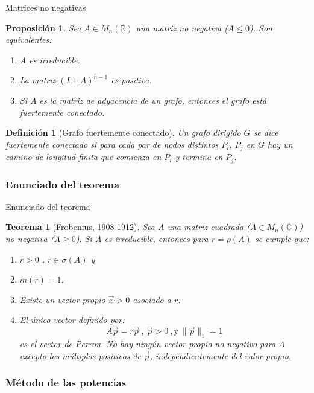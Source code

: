 \documentclass[ignorenonframetext,aspectratio=43,]{beamer}
\newtheorem{teorema}{Teorema}
\newtheorem{definicion}{Definición}
\newtheorem{proposicion}{Proposición}
\begin{document}
\begin{frame}{Matrices no negativas}
\begin{proposicion}
\label{irreducible}
\label{positiva}
Sea $A \in M_n(\mathbb{R})$ una matriz no negativa ($A \leq 0$). Son equivalentes:
\begin{enumerate}
\item A es irreducible.
\item La matriz $(I + A)^{n - 1}$ es positiva.
\item Si $A$ es la matriz de adyacencia de un grafo, entonces el grafo está fuertemente conectado.
\end{enumerate}
\end{proposicion}

\begin{definicion}[Grafo fuertemente conectado]
Un grafo dirigido $G$ se dice fuertemente conectado si para cada par de nodos distintos $P_i$, $P_j$ en $G$ hay un camino de longitud finita que comienza en $P_i$ y termina en $P_j$.
\end{definicion}
\end{frame}

\subsubsection{Enunciado del teorema}

\begin{frame}{Enunciado del teorema}
\begin{teorema}[Frobenius, 1908-1912]
Sea $A $ una matriz cuadrada ($A \in M_n(\mathbb{C})$) no negativa ($A \geq 0$). Si $A$ es irreducible, entonces para $r = \rho(A)$ se cumple que:
\begin{enumerate}
\item $r >0$ , $r \in \sigma(A)$ y
\item $m(r) = 1$.
\item Existe un vector propio $\vec{x} > 0$ asociado a $r$.
\item El único vector definido por:
$$A \vec{p} = r \vec{p}  \ , \ \vec{p}> 0 \ , \textrm{y} \ \|\vec{p}\|_1 = 1 $$
es el vector de Perron. No hay ningún vector propio no negativo para $A$ excepto los múltiplos positivos de $\vec{p}$, independientemente del valor propio.
\end{enumerate}
\end{teorema}
\end{frame}

\subsubsection{Método de las potencias}
\end{document}
